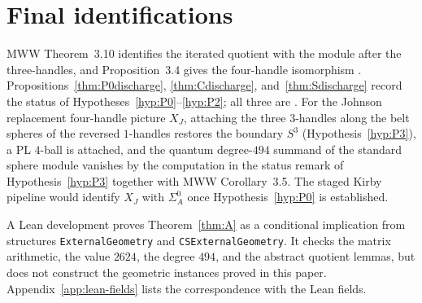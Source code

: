 \section{Final identifications}\label{sec:final-identifications}

MWW Theorem~3.10 identifies the iterated quotient with the module after the
three-handles, and Proposition~3.4 gives the four-handle isomorphism
\cite{ManolescuWalkerWedrich2023}.  Propositions~\ref{thm:P0discharge},
\ref{thm:Cdischarge}, and~\ref{thm:Sdischarge} record the status of
Hypotheses~\ref{hyp:P0}--\ref{hyp:P2}; all three are \Open.  For the Johnson
replacement four-handle picture $X_J$, attaching the three $3$-handles
along the belt spheres of the reversed $1$-handles restores the boundary
$S^3$ (Hypothesis~\ref{hyp:P3}), a PL $4$-ball is attached, and the quantum
degree-$494$ summand of the standard sphere module vanishes by the
computation in the status remark of Hypothesis~\ref{hyp:P3} together with
MWW Corollary~3.5.  The staged Kirby pipeline would identify $X_J$ with
$\Sigma_A^0$ once Hypothesis~\ref{hyp:P0} is established.

\begin{remark}\label{rem:lean-boundary}
A Lean development \cite{Lean4} proves Theorem~\ref{thm:A} as a conditional
implication from structures \texttt{ExternalGeometry} and
\texttt{CSExternalGeometry}.  It checks the matrix arithmetic, the value
$2624$, the degree $494$, and the abstract quotient lemmas, but does not
construct the geometric instances proved in this paper.  Appendix~\ref{app:lean-fields}
lists the correspondence with the Lean fields.
\end{remark}
